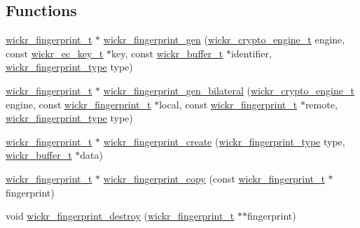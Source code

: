 \subsection*{Functions}
\begin{DoxyCompactItemize}
\item 
\mbox{\hyperlink{structwickr__fingerprint}{wickr\+\_\+fingerprint\+\_\+t}} $\ast$ \mbox{\hyperlink{group__wickr__fingerprint_gac4791ddf5ea675508dd6627ebf33c62e}{wickr\+\_\+fingerprint\+\_\+gen}} (\mbox{\hyperlink{structwickr__crypto__engine}{wickr\+\_\+crypto\+\_\+engine\+\_\+t}} engine, const \mbox{\hyperlink{structwickr__ec__key}{wickr\+\_\+ec\+\_\+key\+\_\+t}} $\ast$key, const \mbox{\hyperlink{structwickr__buffer}{wickr\+\_\+buffer\+\_\+t}} $\ast$identifier, \mbox{\hyperlink{group__wickr__fingerprint_ga09d6f8936a6d1fbacb13c643c2e81810}{wickr\+\_\+fingerprint\+\_\+type}} type)
\item 
\mbox{\hyperlink{structwickr__fingerprint}{wickr\+\_\+fingerprint\+\_\+t}} $\ast$ \mbox{\hyperlink{group__wickr__fingerprint_gae26d5c57687ae01678495b4e3962963d}{wickr\+\_\+fingerprint\+\_\+gen\+\_\+bilateral}} (\mbox{\hyperlink{structwickr__crypto__engine}{wickr\+\_\+crypto\+\_\+engine\+\_\+t}} engine, const \mbox{\hyperlink{structwickr__fingerprint}{wickr\+\_\+fingerprint\+\_\+t}} $\ast$local, const \mbox{\hyperlink{structwickr__fingerprint}{wickr\+\_\+fingerprint\+\_\+t}} $\ast$remote, \mbox{\hyperlink{group__wickr__fingerprint_ga09d6f8936a6d1fbacb13c643c2e81810}{wickr\+\_\+fingerprint\+\_\+type}} type)
\item 
\mbox{\hyperlink{structwickr__fingerprint}{wickr\+\_\+fingerprint\+\_\+t}} $\ast$ \mbox{\hyperlink{group__wickr__fingerprint_gac796adfe045ef69852ec1f452880add4}{wickr\+\_\+fingerprint\+\_\+create}} (\mbox{\hyperlink{group__wickr__fingerprint_ga09d6f8936a6d1fbacb13c643c2e81810}{wickr\+\_\+fingerprint\+\_\+type}} type, \mbox{\hyperlink{structwickr__buffer}{wickr\+\_\+buffer\+\_\+t}} $\ast$data)
\item 
\mbox{\hyperlink{structwickr__fingerprint}{wickr\+\_\+fingerprint\+\_\+t}} $\ast$ \mbox{\hyperlink{group__wickr__fingerprint_gac2497b535d0864b0fcc91004a979a313}{wickr\+\_\+fingerprint\+\_\+copy}} (const \mbox{\hyperlink{structwickr__fingerprint}{wickr\+\_\+fingerprint\+\_\+t}} $\ast$fingerprint)
\item 
void \mbox{\hyperlink{group__wickr__fingerprint_ga7d3600525872a1d587b2774db7b8b12a}{wickr\+\_\+fingerprint\+\_\+destroy}} (\mbox{\hyperlink{structwickr__fingerprint}{wickr\+\_\+fingerprint\+\_\+t}} $\ast$$\ast$fingerprint)
$$
\end{DoxyCompactItemize}
